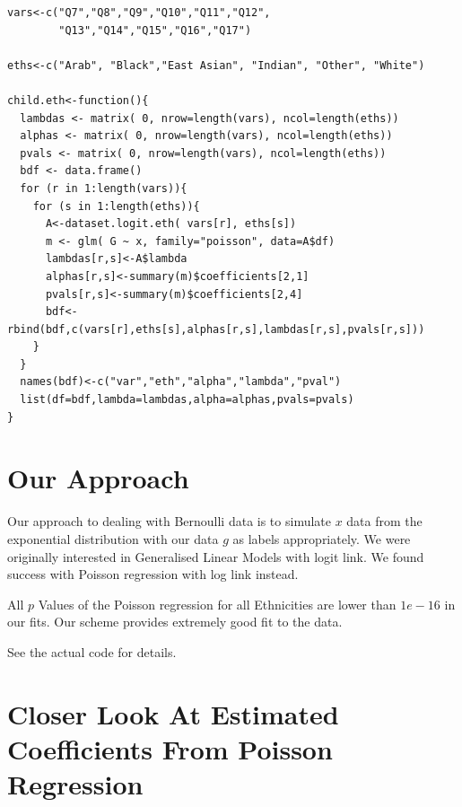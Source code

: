 \documentclass{amsart}
\begin{document}
\begin{verbatim}
vars<-c("Q7","Q8","Q9","Q10","Q11","Q12",
        "Q13","Q14","Q15","Q16","Q17")

eths<-c("Arab", "Black","East Asian", "Indian", "Other", "White")

child.eth<-function(){
  lambdas <- matrix( 0, nrow=length(vars), ncol=length(eths))
  alphas <- matrix( 0, nrow=length(vars), ncol=length(eths))
  pvals <- matrix( 0, nrow=length(vars), ncol=length(eths))
  bdf <- data.frame()
  for (r in 1:length(vars)){
    for (s in 1:length(eths)){
      A<-dataset.logit.eth( vars[r], eths[s])
      m <- glm( G ~ x, family="poisson", data=A$df)
      lambdas[r,s]<-A$lambda
      alphas[r,s]<-summary(m)$coefficients[2,1]
      pvals[r,s]<-summary(m)$coefficients[2,4]
      bdf<-rbind(bdf,c(vars[r],eths[s],alphas[r,s],lambdas[r,s],pvals[r,s]))
    }
  } 
  names(bdf)<-c("var","eth","alpha","lambda","pval")
  list(df=bdf,lambda=lambdas,alpha=alphas,pvals=pvals)
}
\end{verbatim}

\section{Our Approach}

Our approach to dealing with Bernoulli data is to simulate $x$ data from the exponential distribution with our data $g$ as labels appropriately. We were originally interested in Generalised Linear Models with logit link.  We found success with Poisson regression with log link instead.  

All $p$ Values of the Poisson regression for all Ethnicities are lower than $1e-16$ in our fits.  Our scheme provides extremely good fit to the data. 

See the actual code for details.

\section{Closer Look At Estimated Coefficients From Poisson Regression}
\end{document}
